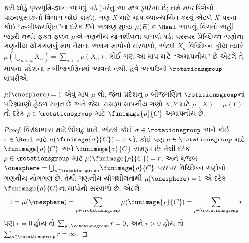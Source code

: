 ફરી થોડું પૃષ્ઠભૂમિ-જ્ઞાન
આપવું પડે (પરંતુ આ
\emph{માત્ર} રૂપરેખા છે; તમે
\emph{માપ} વિશેનો પાઠ્યપુસ્તકનો
વિભાગ જોઈ શકો). ગણ $X$ માટે
માપ વ્યાખ્યાયિત કરવું એટલે
$X$ પરના કોઈ ``$\sigma$-બીજગણિત''ના
દરેક $E$ને અઋણ મૂલ્ય
$\mu(E) \in \Real$ આપવું.
વિગતો અહીં જરૂરી નથી;
ફક્ત ફલન $\mu$એ ગણનીય
યોગશીલતા પાળવી પડે: પરસ્પર
વિચ્છિન્ન ગણોના ગણનીય યોગગણનું
માપ તેમના અલગ માપોનો સરવાળો,
એટલે $X_n$ વિચ્છિન્ન હોય ત્યારે
$\mu(\bigcup_{n < \omega} X_n) =
\sum_{n < \omega}\mu(X_n)$.
કોઈ ગણ આ માપ માટે ``અમાપનીય'' છે એટલે
તે માપના પ્રદેશના $\sigma$-બીજગણિતમાં આવતો નથી. હવે અગાઉનો
$\rotationsgroup$ વાપરીએ:

\begin{cor}[વિટાલી]
$\mu(\onesphere) = 1$ એવું
માપ $\mu$ લો, જેના પ્રદેશનું $\sigma$-બીજગણિત
$\rotationsgroup$નાં પરિભ્રમણો હેઠળ સંવૃત છે અને જેમાં
સમરૂપ માપનીય ગણો $X,Y$ માટે $\mu(X)=\mu(Y)$. તો દરેક
$\rho \in \rotationsgroup$ માટે
$\funimage{\rho}{C}$ અમાપનીય છે.
\end{cor}

\begin{proof}
વિરોધાભાસ માટે ઊલટું ધારો.
એટલે કોઈ $\sigma \in
\rotationsgroup$ અને કોઈ
$r \in \Real$ માટે
$\mu(\funimage{\sigma}{C}) = r$
લો. કોઈ પણ $\rho \in
\rotationsgroup$ માટે
$\funimage{\rho}{C}$ અને
$\funimage{\sigma}{C}$ સમરૂપ
છે; તેથી દરેક $\rho \in
\rotationsgroup$ માટે
$\mu(\funimage{\rho}{C}) = r$.
 અને
 મુજબ
$\onesphere = \bigcup_{\rho \in
\rotationsgroup}\funimage{\rho}{C}$
પરસ્પર વિચ્છિન્ન ગણોનો
ગણનીય યોગગણ છે. તેથી
ગણનીય યોગશીલતાથી
$\mu(\onesphere) = 1$ એ
દરેક $\funimage{\rho}{C}$ના
માપોનો સરવાળો છે, એટલે
\[
	1 = \mu(\onesphere) = \sum_{\rho \in \rotationsgroup}\mu(\funimage{\rho}{C}) = \sum_{\rho \in \rotationsgroup}r
\]
પણ $r = 0$ હોય તો
$\sum_{\rho \in \rotationsgroup}r = 0$,
અને $r > 0$ હોય તો
$\sum_{\rho \in \rotationsgroup}r = \infty$.
\end{proof}
\endgroup


\OLEndChapterHook
\endgroup
